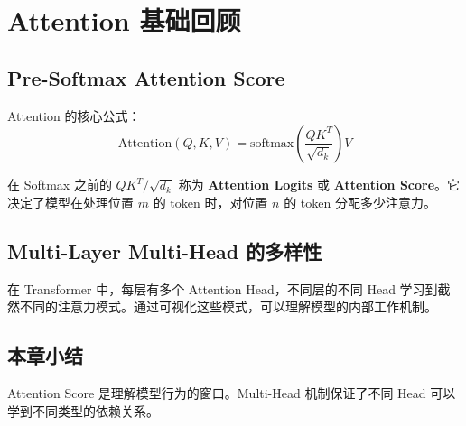 \section{Attention 基础回顾}

\subsection{Pre-Softmax Attention Score}

Attention 的核心公式：
$$
\text{Attention}(Q, K, V) = \text{softmax}\left(\frac{QK^T}{\sqrt{d_k}}\right) V
$$

在 Softmax 之前的 $QK^T / \sqrt{d_k}$ 称为 \textbf{Attention Logits} 或 \textbf{Attention Score}。它决定了模型在处理位置 $m$ 的 token 时，对位置 $n$ 的 token 分配多少注意力。

\subsection{Multi-Layer Multi-Head 的多样性}

在 Transformer 中，每层有多个 Attention Head，不同层的不同 Head 学习到截然不同的注意力模式。通过可视化这些模式，可以理解模型的内部工作机制。

\subsection{本章小结}

Attention Score 是理解模型行为的窗口。Multi-Head 机制保证了不同 Head 可以学到不同类型的依赖关系。

